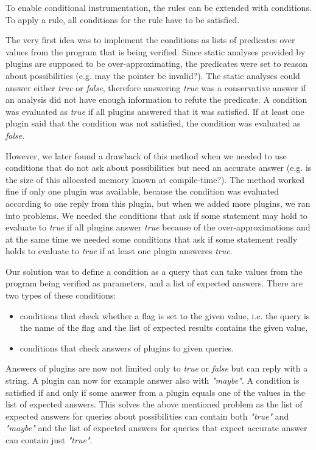 To enable conditional instrumentation, the rules can be extended with
conditions. To apply a rule, all conditions for the rule have to be satisfied.

The very first idea was to implement the conditions as lists of predicates over
values from the program that is being verified. Since static analyses provided
by plugins are supposed to be over-approximating, the predicates were set to
reason about possibilities (e.g. may the pointer be invalid?). The static
analyses could answer either \emph{true} or \emph{false}, therefore answering
\emph{true} was a conservative answer if an analysis did not have enough
information to refute the predicate. A condition was evaluated as \emph{true}
if all plugins answered that it was satisfied. If at least one plugin said that
the condition was not satisfied, the condition was evaluated as \emph{false}.

However, we later found a drawback of this method when we needed to use
conditions that do not ask about possibilities but need an accurate answer
(e.g. is the size of this allocated memory known at compile-time?). The method
worked fine if only one plugin was available, because the condition was
evaluated according to one reply from this plugin, but when we added more
plugins, we ran into problems. We needed the conditions that ask if some
statement may hold to evaluate to \emph{true} if all plugins answer
\emph{true} because of the over-approximations and at the same time we needed
some conditions that ask if some statement really holds to evaluate to
\emph{true} if at least one plugin answeres \emph{true}.

Our solution was to define a condition as a query that can take values from the
program being verified as parameters, and a list of expected answers. There are
two types of these conditions:
\begin{itemize}
 \item conditions that check whether a flag is set to the given value, i.e. the
 query is the name of the flag and the list of expected results contains the
 given value,
 \item conditions that check answers of plugins to given queries.
\end{itemize}
Answers of plugins are now not limited only to \emph{true} or \emph{false} but
can reply with a string. A plugin can now for example answer also with
\emph{"maybe"}. A condition is satisfied if and only if some answer from a
plugin equals one of the values in the list of expected answers. This solves
the above mentioned problem as the list of expected answers for queries about
possibilities can contain both \emph{"true"} and \emph{"maybe"} and the list
of expected answers for queries that expect accurate answer can contain just
\emph{"true"}.

